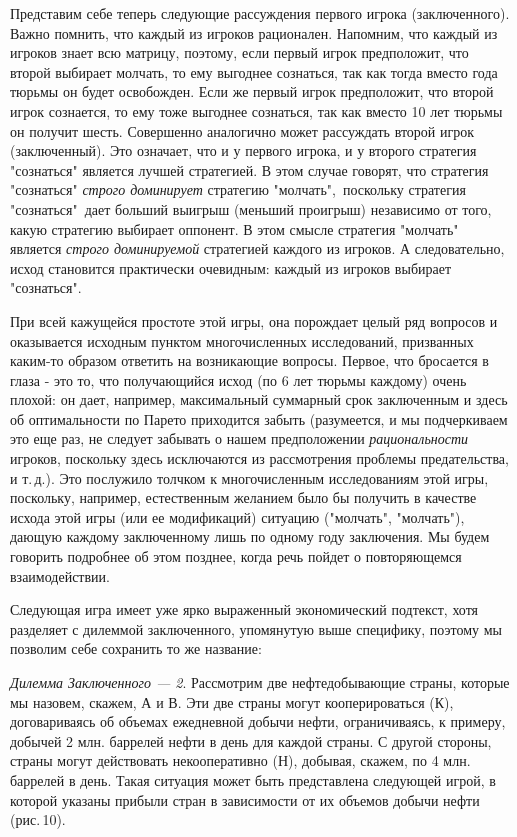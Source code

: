 \documentclass[12pt]{article}
\begin{document}
Представим себе теперь следующие рассуждения первого игрока
(заключенного). Важно помнить, что каждый из игроков рационален.
Напомним, что каждый из игроков знает всю матрицу, поэтому, если
первый игрок предположит, что второй выбирает молчать, то ему
выгоднее сознаться, так как тогда вместо года тюрьмы он будет
освобожден. Если же первый игрок предположит, что второй игрок
сознается, то ему тоже выгоднее сознаться, так как вместо 10 лет
тюрьмы он получит шесть. Совершенно аналогично может рассуждать
второй игрок (заключенный). Это означает, что и у первого игрока,
и у второго стратегия "сознаться" является лучшей стратегией. В
этом случае говорят, что стратегия "сознаться" \emph{строго
доминирует} стратегию "молчать",\, поскольку стратегия
"сознаться"\, дает больший выигрыш (меньший проигрыш) независимо
от того, какую стратегию выбирает оппонент. В этом смысле
стратегия "молчать" является \emph{строго доминируемой} стратегией
каждого из игроков. А следовательно, исход становится практически
очевидным: каждый из игроков выбирает "сознаться".

При всей кажущейся простоте этой игры, она порождает целый ряд
вопросов и оказывается исходным пунктом многочисленных
исследований, призванных каким-то образом ответить на возникающие
вопросы. Первое, что бросается в глаза - это то, что получающийся
исход (по 6 лет тюрьмы каждому) очень плохой: он дает, например,
максимальный суммарный срок заключенным и здесь об оптимальности
по Парето приходится забыть (разумеется, и мы подчеркиваем это еще
раз, не следует забывать о нашем предположении {\it
рациональности} игроков, поскольку здесь исключаются из
рассмотрения проблемы предательства, и т.\,д.). Это послужило
толчком к многочисленным исследованиям этой игры, поскольку,
например, естественным желанием было бы получить в качестве исхода
этой игры (или ее модификаций) ситуацию ("молчать", "молчать"),
дающую каждому заключенному лишь по одному году заключения. Мы
будем говорить подробнее об этом позднее, когда речь пойдет о
повторяющемся взаимодействии.

Следующая игра имеет уже ярко выраженный экономический подтекст,
хотя разделяет с дилеммой заключенного, упомянутую выше специфику,
поэтому мы позволим себе сохранить то же название:

{\it Дилемма Заключенного --- 2}. Рассмотрим две нефтедобывающие
страны, которые мы назовем, скажем, А и В.  Эти две страны могут
кооперироваться (К), договариваясь об объемах ежедневной добычи
нефти, ограничиваясь, к примеру, добычей 2 млн. баррелей нефти в
день для каждой страны. С другой стороны, страны могут действовать
некооперативно (Н), добывая, скажем, по 4 млн. баррелей в день.
Такая ситуация может быть представлена следующей игрой, в которой
указаны прибыли стран в зависимости от их объемов добычи нефти
(рис.\,10).
\end{document}
